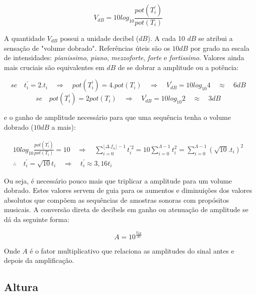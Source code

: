\begin{equation}\label{decibels}
V_{dB}=10log_{10}\frac{pot(T^{'}_i)}{pot(T_i)}
\end{equation}

A quantidade $V_{dB}$ possui a unidade decibel ($dB$). A cada 10 $dB$ se atribui
a sensação de "volume dobrado". Referências úteis são os $10dB$ por grado na escala
de intensidades: \emph{pianissimo}, \emph{piano}, \emph{mezzoforte}, \emph{forte} e \emph{fortissimo}. Valores ainda
mais cruciais são equivalentes em $dB$ de se dobrar
a amplitude ou a potência:

\begin{equation}\label{eq:ampVol}
se \quad  t_i^{'}=2 . t_i \quad \Rightarrow \quad pot(T^{'}_i)=4 . pot(T_i) \quad \Rightarrow \quad V^{'}_{dB}=10log_{10} 4 \quad  \approx \quad 6 dB
\end{equation}
\begin{equation}\label{eq:potVol}
se \quad pot(T^{'}_i)=2 pot(T_i) \quad \Rightarrow \quad V^{'}_{dB}=10log_{10} 2 \quad \approx \quad 3 dB
\end{equation}

e o ganho de amplitude
necessário para que uma sequência tenha o volume dobrado ($10dB$ a mais):

\begin{align}
10log_{10}\frac{pot(T^{'}_i)}{pot(T_i)} = 10 \quad \Rightarrow \quad \sum_{i=0}^{\lfloor \Delta.f_a \rfloor -1}t^{'2}_i=10\sum_{i=0}^{\Lambda-1}t_i^2=\sum_{i=0}^{\Lambda-1}(\sqrt{10}.t_i)^2 \label{eq:dobraAmp}\\
\therefore \quad t^{'}_i=\sqrt{10}t_i \quad \Rightarrow \quad t^{'}_i \approx 3,16t_i\label{eq:dobraVol}
\end{align}

Ou seja, é necessário pouco mais que triplicar a amplitude para um volume dobrado.
Estes valores servem de guia para os aumentos e diminuições dos valores absolutos que compõem as
sequências de amostras sonoras com propósitos musicais. A conversão direta de decibels
em ganho ou atenuação de amplitude se dá da seguinte forma:

\begin{equation}\label{ampDec}
A = 10^{\frac{V_{dB}}{20}}
\end{equation}

Onde $A$ é o fator multiplicativo que relaciona as amplitudes do sinal antes e depois da amplificação.

\subsection{Altura}

